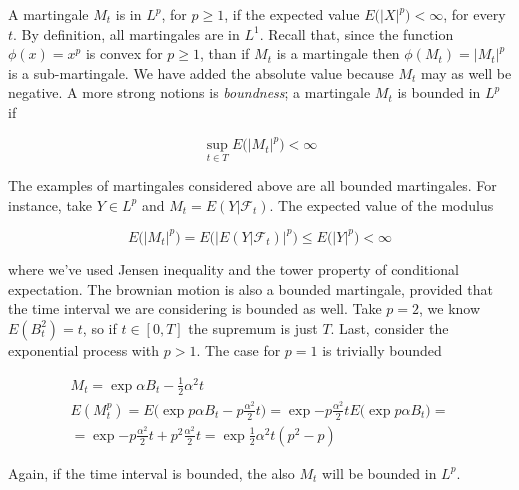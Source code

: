 A martingale $M_t$ is in $L^p$, for $p \geq 1$, if the expected value $E\big( \vert X \vert^p \big) < \infty$, for every $t$. By definition, all martingales are in $L^1$. Recall that, since the function $\phi(x) = x^p$ is convex for $p \geq 1$, than if $M_t$ is a martingale then $\phi(M_t) = \vert M_t \vert^p$ is a sub-martingale. We have added the absolute value because $M_t$ may as well be negative. A more strong notions is \textit{boundness}; a martingale $M_t$ is bounded in $L^p$ if 

\begin{equation*} 
    \sup_{t \in T} E\big( \vert M_t \vert^p \big) < \infty
\end{equation*}

The examples of martingales considered above are all bounded martingales. For instance, take $Y \in L^p$ and $M_t = E(Y \vert \mathcal{F}_t)$. The expected value of the modulus

\begin{equation*}
    E\big( \vert M_t \vert^p \big) = E\Big( \big\vert E(Y\vert \mathcal{F}_t) \big\vert^p \Big) \leq E\big( \vert Y \vert^p \big) < \infty 
\end{equation*}

where we've used Jensen inequality and the tower property of conditional expectation. The brownian motion is also a bounded martingale, provided that the time interval we are considering is bounded as well. Take $p = 2$, we know $E(B_t^2) = t$, so if $t \in [0,T]$ the supremum is just $T$. Last, consider the exponential process with $p > 1$. The case for $p = 1$ is trivially bounded

\begin{gather*}
    M_t = \exp{\alpha B_t - \frac{1}{2}\alpha^2 t} \\
    E(M_t^p) = E\Big( \exp{p \alpha B_t - p \frac{\alpha^2}{2}t} \Big) = \exp{-p\frac{\alpha^2}{2}t} E\Big( \exp{p \alpha B_t} \Big) = \\
    = \exp{-p\frac{\alpha^2}{2}t+p^2 \frac{\alpha^2}{2}t} = \exp{\frac{1}{2}\alpha^2 t(p^2-p)}
\end{gather*}

Again, if the time interval is bounded, the also $M_t$ will be bounded in $L^p$. 

